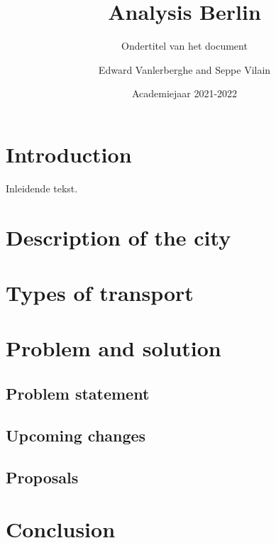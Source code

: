 \documentclass[a4paper,twoside,kul]{kulakreport} %
\title{Analysis Berlin}
\subtitle{Ondertitel van het document}
\author{Edward Vanlerberghe and Seppe Vilain}
\institute{KU Leuven}
\date{Academiejaar 2021-2022}
\begin{document}

\titlepage

\tableofcontents

\chapter*{Introduction}
Inleidende tekst.

\chapter{Description of the city}

\chapter{Types of transport}
	
	
	
\chapter{Problem and solution}
\section{Problem statement}


\section{Upcoming changes}


\section{Proposals}


\chapter*{Conclusion}



\end{document}
